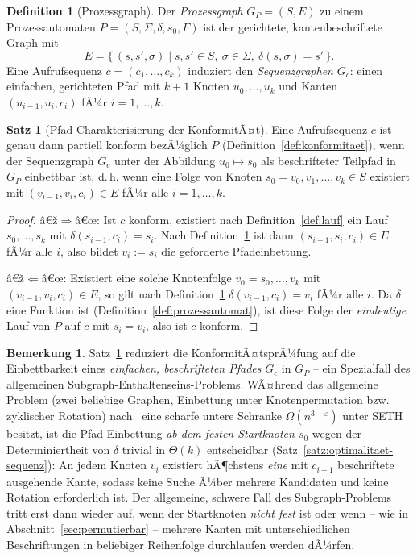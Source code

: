 ﻿\documentclass[a4paper,12pt]{article}
\theoremstyle{definition}
\newtheorem{definition}{Definition}
\newtheorem{satz}{Satz}
\newtheorem{bemerkung}{Bemerkung}
\begin{document}
\begin{definition}[Prozessgraph]
	\label{def:prozessgraph}
	Der \emph{Prozessgraph} $G_P=(S,E)$ zu einem Prozessautomaten
	$P=(S,\Sigma,\delta,s_0,F)$ ist der gerichtete, kantenbeschriftete Graph mit
	\[
		E = \{\, (s,s',\sigma) \mid s,s' \in S,\ \sigma\in\Sigma,\ \delta(s,\sigma)=s' \,\}.
	\]
	Eine Aufrufsequenz $c=(c_1,\ldots,c_k)$ induziert den \emph{Sequenzgraphen}
	$G_c$: einen einfachen, gerichteten Pfad mit $k+1$ Knoten $u_0,\ldots,u_k$ und Kanten
	$(u_{i-1},u_i,c_i)$ fÃ¼r $i=1,\ldots,k$.
\end{definition}

\begin{satz}[Pfad-Charakterisierung der KonformitÃ¤t]
	\label{satz:pfadcharakterisierung}
	Eine Aufrufsequenz $c$ ist genau dann partiell konform bezÃ¼glich $P$
	(Definition~\ref{def:konformitaet}), wenn der Sequenzgraph $G_c$ unter der Abbildung
	$u_0 \mapsto s_0$ als beschrifteter Teilpfad in $G_P$ einbettbar ist, d.\,h. wenn eine
	Folge von Knoten $s_0=v_0,v_1,\ldots,v_k \in S$ existiert mit
	$(v_{i-1},v_i,c_i)\in E$ fÃ¼r alle $i=1,\ldots,k$.
\end{satz}

\begin{proof}
	â€ž$\Rightarrow$â€œ: Ist $c$ konform, existiert nach Definition~\ref{def:lauf} ein Lauf
	$s_0,\ldots,s_k$ mit $\delta(s_{i-1},c_i)=s_i$. Nach Definition~\ref{def:prozessgraph}
	ist dann $(s_{i-1},s_i,c_i)\in E$ fÃ¼r alle $i$, also bildet $v_i:=s_i$ die geforderte
	Pfadeinbettung.

	â€ž$\Leftarrow$â€œ: Existiert eine solche Knotenfolge $v_0=s_0,\ldots,v_k$ mit
	$(v_{i-1},v_i,c_i)\in E$, so gilt nach Definition~\ref{def:prozessgraph}
	$\delta(v_{i-1},c_i)=v_i$ fÃ¼r alle $i$. Da $\delta$ eine Funktion ist
	(Definition~\ref{def:prozessautomat}), ist diese Folge der \emph{eindeutige} Lauf von
	$P$ auf $c$ mit $s_i=v_i$, also ist $c$ konform. \qedhere
\end{proof}

\begin{bemerkung}
	\label{bem:einfacher-fall}
	Satz~\ref{satz:pfadcharakterisierung} reduziert die KonformitÃ¤tsprÃ¼fung auf die
	Einbettbarkeit eines \emph{einfachen, beschrifteten Pfades} $G_c$ in $G_P$ -- ein
	Spezialfall des allgemeinen Subgraph-Enthaltenseins-Problems. WÃ¤hrend das allgemeine
	Problem (zwei beliebige Graphen, Einbettung unter Knotenpermutation bzw. zyklischer
	Rotation) nach~\cite{epp2026subgraph} eine scharfe untere Schranke
	$\Omega(n^{3-\varepsilon})$ unter SETH besitzt, ist die Pfad-Einbettung \emph{ab dem
	festen Startknoten $s_0$} wegen der Determiniertheit von $\delta$ trivial in
	$\Theta(k)$ entscheidbar (Satz~\ref{satz:optimalitaet-sequenz}): An jedem Knoten $v_i$
	existiert hÃ¶chstens \emph{eine} mit $c_{i+1}$ beschriftete ausgehende Kante, sodass
	keine Suche Ã¼ber mehrere Kandidaten und keine Rotation erforderlich ist. Der
	allgemeine, schwere Fall des Subgraph-Problems tritt erst dann wieder auf, wenn der
	Startknoten \emph{nicht fest} ist oder wenn -- wie in
	Abschnitt~\ref{sec:permutierbar} -- mehrere Kanten mit unterschiedlichen Beschriftungen
	in beliebiger Reihenfolge durchlaufen werden dÃ¼rfen.
\end{bemerkung}
\end{document}
